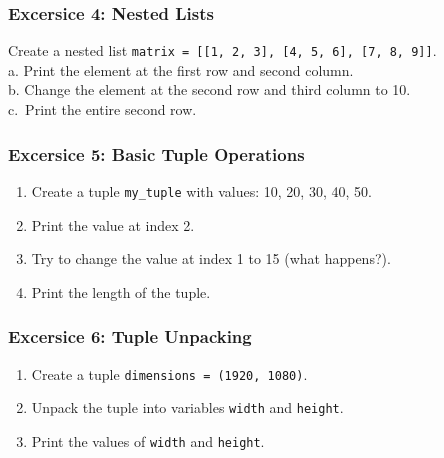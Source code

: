 \documentclass[
  letterpaper,
  DIV=11,
  numbers=noendperiod]{scrreprt}
\providecommand{\tightlist}{%
  \setlength{\itemsep}{0pt}\setlength{\parskip}{0pt}}\usepackage{longtable,booktabs,array}
\begin{document}
\hypertarget{excersice-4-nested-lists}{%
\subsubsection{Excersice 4: Nested
Lists}\label{excersice-4-nested-lists}}

Create a nested list
\texttt{matrix\ =\ {[}{[}1,\ 2,\ 3{]},\ {[}4,\ 5,\ 6{]},\ {[}7,\ 8,\ 9{]}{]}}.\\
a. Print the element at the first row and second column.\\
b. Change the element at the second row and third column to 10.\\
c.~Print the entire second row.

\hypertarget{excersice-5-basic-tuple-operations}{%
\subsubsection{Excersice 5: Basic Tuple
Operations}\label{excersice-5-basic-tuple-operations}}

\begin{enumerate}
\def\labelenumi{\alph{enumi}.}
\tightlist
\item
  Create a tuple \texttt{my\_tuple} with values: 10, 20, 30, 40, 50.\\
\item
  Print the value at index 2.\\
\item
  Try to change the value at index 1 to 15 (what happens?).\\
\item
  Print the length of the tuple.
\end{enumerate}

\hypertarget{excersice-6-tuple-unpacking}{%
\subsubsection{Excersice 6: Tuple
Unpacking}\label{excersice-6-tuple-unpacking}}

\begin{enumerate}
\def\labelenumi{\alph{enumi}.}
\tightlist
\item
  Create a tuple \texttt{dimensions\ =\ (1920,\ 1080)}.\\
\item
  Unpack the tuple into variables \texttt{width} and \texttt{height}.\\
\item
  Print the values of \texttt{width} and \texttt{height}.
\end{enumerate}
\end{document}
